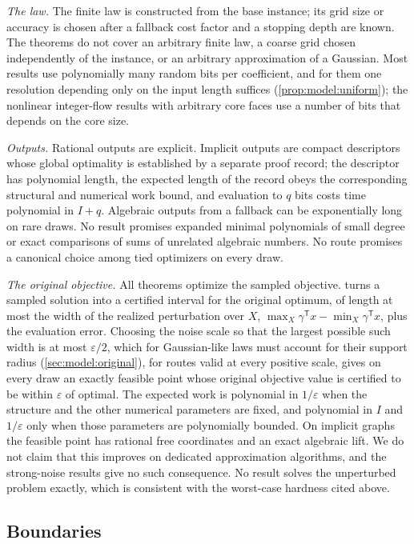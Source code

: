\emph{The law.} The finite law is constructed from the base instance; its
grid size or accuracy is chosen after a fallback cost factor and a stopping
depth are known. The theorems do not cover an arbitrary finite law, a coarse
grid chosen independently of the instance, or an arbitrary approximation of
a Gaussian. Most results use polynomially many random bits per coefficient,
and for them one resolution depending only on the input length suffices
(\cref{prop:model:uniform}); the nonlinear integer-flow results with
arbitrary core faces use a number of bits that depends on the core size.

\emph{Outputs.} Rational outputs are explicit. Implicit outputs are compact
descriptors whose global optimality is established by a separate proof
record; the descriptor has polynomial length, the expected length of the
record obeys the corresponding structural and numerical work bound, and
evaluation to $q$ bits costs time
polynomial in $I+q$. Algebraic outputs from a fallback can be exponentially
long on rare draws. No result promises expanded minimal polynomials of small
degree or exact comparisons of sums of unrelated algebraic numbers. No
route promises a canonical choice among tied optimizers on every draw.

\emph{The original objective.} All theorems optimize the sampled objective.
 turns a sampled solution into a certified interval
for the original optimum, of length at most the width of the realized
perturbation over $X$, $\max_X\gamma^{\mathsf T}x-\min_X\gamma^{\mathsf T}x$,
plus the evaluation error. Choosing the noise scale so that the largest
possible such width is at most $\varepsilon/2$, which for Gaussian-like laws
must account for their support radius (\cref{sec:model:original}), for routes valid at every positive scale, gives
on every draw an exactly feasible point whose original objective value is
certified to be within $\varepsilon$ of optimal. The expected work is
polynomial in $1/\varepsilon$ when the structure and the other numerical
parameters are fixed, and polynomial in $I$ and $1/\varepsilon$ only when
those parameters are polynomially bounded. On implicit graphs the
feasible point has rational free coordinates and an exact algebraic lift. We
do not claim that this improves on dedicated approximation algorithms, and
the strong-noise results give no such consequence. No result solves the unperturbed problem exactly,
which is consistent with the worst-case hardness cited above.

\subsection{Boundaries}\label{sec:intro:boundaries}

